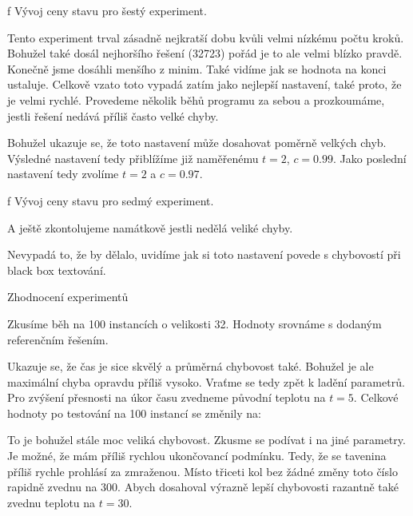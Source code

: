 \centerline{ \picwidth=17cm  }
\caption/f Vývoj ceny stavu pro šestý experiment.
\bigskip

Tento experiment trval zásadně nejkratší dobu kvůli velmi nízkému počtu kroků. Bohužel také dosál nejhoršího řešení (32723) pořád je to ale velmi blízko pravdě. Konečně jsme dosáhli menšího  z minim. Také vidíme jak se hodnota na konci ustaluje. Celkově vzato toto vypadá zatím jako nejlepší nastavení, také proto, že je velmi rychlé. Provedeme několik běhů programu za sebou a prozkoumáme, jestli řešení nedává příliš často velké chyby.

\bigskip
\centerline{}\bigskip

Bohužel ukazuje se, že toto nastavení může dosahovat poměrně velkých chyb. Výsledné nastavení tedy přiblížíme již naměřenému $t=2$, $c=0.99$. Jako poslední nastavení tedy zvolíme $t=2$ a $c=0.97$.


\centerline{ \picwidth=17cm  }
\caption/f Vývoj ceny stavu pro sedmý experiment.
\bigskip

A ještě zkontolujeme namátkově jestli nedělá veliké chyby.

\bigskip
\centerline{}\bigskip

Nevypadá to, že by dělalo, uvidíme jak si toto nastavení povede s chybovostí při black box textování.


\vfill\break
\sec Zhodnocení experimentů


Zkusíme běh na 100 instancích o velikosti 32. Hodnoty srovnáme s dodaným referenčním řešením.

\bigskip
\centerline{}\bigskip


Ukazuje se, že čas je sice skvělý a průměrná chybovost také. Bohužel je ale maximální chyba opravdu příliš vysoko. Vraťme se tedy zpět k ladění parametrů. Pro zvýšení přesnosti na úkor času zvedneme původní teplotu na $t=5$. Celkové hodnoty po testování na 100 instancí se změnily na:

\bigskip
\centerline{}\bigskip

To je bohužel stále moc veliká chybovost. Zkusme se podívat i na jiné parametry. Je možné, že mám příliš rychlou ukončovancí podmínku. Tedy, že se tavenina příliš rychle prohlásí za zmraženou. Místo třiceti kol bez žádné změny toto číslo rapidně zvednu na 300. Abych dosahoval výrazně lepší chybovosti razantně také zvednu teplotu na $t=30$.

